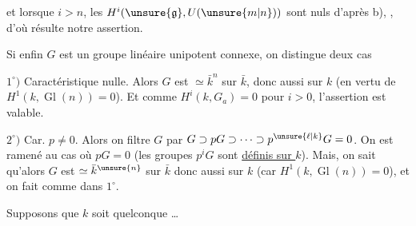 
et lorsque $i>n$, les  $H^i(\unsure{\mathfrak g},U(\unsure{m|n}))$ sont nuls d'après b), , d'où résulte notre assertion.

Si enfin $G$ est  un groupe linéaire unipotent connexe, on distingue deux cas

$1^\circ)$ Caractéristique nulle. Alors $G$ est $\simeq\bar k^n$ sur $\bar k$, donc aussi sur $k$ (en vertu de $H^1(k,\operatorname{Gl}(n))=0$).
Et comme $H^i(k,G_a)=0$ pour $i>0$, l'assertion est valable.

$2^\circ)$ Car. $p\ne0$. Alors on filtre $G$ par $G\supset pG\supset\cdots\supset p^{\unsure{\ell|k}}G=0$. On est ramené au cas où $pG=0$ (les groupes $p^iG$ sont \uline{définis sur $k$}).
Mais, on sait qu'alors $G$ est $\simeq\bar k^{\unsure{n}}$ sur $\bar k$ donc \deleted{$\unsure{\simeq}$} aussi sur $k$ (car $H^1(k,\operatorname{Gl}(n))=0$), et on fait comme dans $1^\circ$.

Supposons que $k$ soit quelconque \ldots


